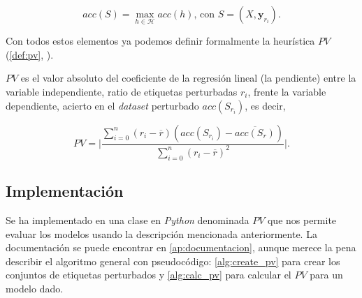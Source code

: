 \begin{equation}
  acc(S) = \max_{h \in \mathcal{H}} acc(h) \text{, con } S = (X, \textbf{y}_{r_i}).
  \label{eq:acc_rel}
\end{equation}

Con todos estos elementos ya podemos definir formalmente la heurística $PV$ (\autoref{def:pv}, \cite{zhang2019perturbation}).

\begin{definicion}\label{def:pv}
  $PV$ es el valor absoluto del coeficiente de la regresión lineal (la pendiente) entre la variable independiente, ratio de etiquetas perturbadas $r_i$, frente la variable dependiente, acierto en el \emph{dataset} perturbado $acc(S_{r_i})$, es decir,

  $$PV = \Bigg|\dfrac{\sum \limits^n_{i = 0} (r_i - \overline{r})(acc(S_{r_{i}}) - \overline{acc(S_r)})}{\sum \limits^n_{i = 0}(r_i - \overline{r})^2}\Bigg|.$$
\end{definicion}

\subsection{Implementación}

Se ha implementado en una clase en \emph{Python} denominada \textbf{$PV$} que nos permite evaluar los modelos usando la descripción mencionada anteriormente. La documentación se puede encontrar en \autoref{ap:documentacion}, aunque merece la pena describir el algoritmo general con pseudocódigo: \autoref{alg:create_pv} para crear los conjuntos de etiquetas perturbados y \autoref{alg:calc_pv} para calcular el $PV$ para un modelo dado.

\begin{algorithm}[htbp]
\SetAlgoLined
 \caption{$PV$($\textbf{y}$, $n$, $err_{ini}$, $err_{fin}$)}
 \label{alg:create_pv}
\end{algorithm}


